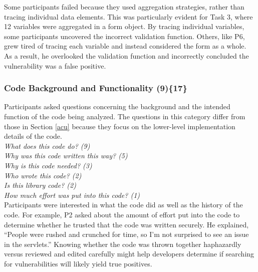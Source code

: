 \documentclass[10pt,journal,compsoc]{IEEEtran}
\begin{document}
Some participants failed because they used aggregation strategies, rather than tracing individual data elements.
This was particularly evident for Task 3, where 12 variables were aggregated in a form object.
By tracing individual variables, some participants uncovered the incorrect validation function. 
Others, like P6, grew tired of tracing each variable and instead considered the form as a whole.
As a result, he overlooked the validation function and incorrectly concluded the vulnerability was a false positive.


%
%	
%



\subsubsection{Code Background and Functionality (9)\{17\}}

\label{cbf}
Participants asked questions concerning the background and the intended function of the code being analyzed. 
The questions in this category differ from those in Section \ref{acu} because they focus on the lower-level implementation details of the code.
\\

\noindent\emph{What does this code do? (9)} \\
\emph{Why was this code written this way? (5)} \\
\emph{Why is this code needed? (3)} \\
\emph{Who wrote this code? (2)} \\
\emph{Is this library code? (2)} \\
\emph{How much effort was put into this code? (1)}
\\

Participants were interested in what the code did as well as the history of the code.
For example, P2 asked about the amount of effort put into the code to determine whether he trusted that the code was written securely.
He explained, ``People were rushed and crunched for time, so I'm not surprised to see an issue in the servlets.'' 
Knowing whether the code was thrown together haphazardly versus reviewed and edited carefully might help developers determine if searching for vulnerabilities will likely yield true positives.
\end{document}
